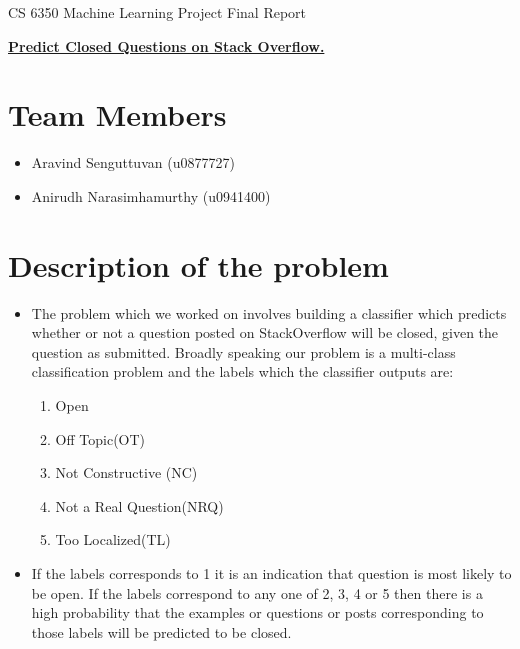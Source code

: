 \documentclass[11pt]{exam}
\begin{document}
\begingroup
\fontsize{14pt}{16pt}\selectfont
\begin{center}  
CS 6350 Machine Learning Project Final Report \\

\end{center}  

\begin{center}
\textbf{\underline{ Predict Closed Questions on Stack Overflow.}
}
\end{center}
\endgroup
%
%



\section{Team Members}

\begin{itemize}
	\item Aravind Senguttuvan (u0877727)
	\item Anirudh Narasimhamurthy (u0941400)
\end{itemize}


\section{Description of the problem}

\begin{itemize}

\item[] The problem which we worked on involves building  a classifier which predicts whether or not a question posted on StackOverflow will be closed, given the question as submitted. Broadly speaking our problem is a multi-class classification problem and the labels which the classifier outputs are:
\begin{enumerate}
	\item Open
	\item Off Topic(OT)
	\item Not Constructive (NC)
	\item Not a Real Question(NRQ)
	\item Too Localized(TL)
\end{enumerate}

\item[] If the labels corresponds to 1 it is an indication that question is most likely to be open. If the labels correspond to any one of 2, 3, 4 or 5 then there is a high probability that the examples or questions or posts corresponding to those labels will be predicted to be closed.
\end{itemize}
\end{document}
